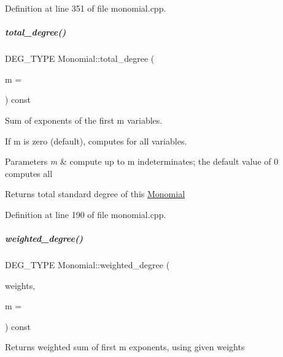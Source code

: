Definition at line 351 of file monomial.\+cpp.

\mbox{\label{group__polygroup_afe6df62857d9f58634d5f6c668f12d35}} 
\subparagraph{\texorpdfstring{total\+\_\+degree()}{total\_degree()}}
{\footnotesize\ttfamily D\+E\+G\+\_\+\+T\+Y\+PE Monomial\+::total\+\_\+degree (\begin{DoxyParamCaption}\item[{N\+V\+A\+R\+\_\+\+T\+Y\+PE}]{m = {} }\end{DoxyParamCaption}) const}



Sum of exponents of the first {\ttfamily m} variables. 

If {\ttfamily m} is zero (default), computes for all variables. 
\begin{DoxyParams}{Parameters}
{\em m} & compute up to {\ttfamily m} indeterminates; the default value of 0 computes all \\
\hline
\end{DoxyParams}
\begin{DoxyReturn}{Returns}
total standard degree of this \hyperlink{group__polygroup_class_monomial}{Monomial} 
\end{DoxyReturn}


Definition at line 190 of file monomial.\+cpp.

\mbox{\label{group__polygroup_a5b19863967dc9801997d2d1058f312a3}} 
\subparagraph{\texorpdfstring{weighted\+\_\+degree()}{weighted\_degree()}}
{\footnotesize\ttfamily D\+E\+G\+\_\+\+T\+Y\+PE Monomial\+::weighted\+\_\+degree (\begin{DoxyParamCaption}\item[{const W\+T\+\_\+\+T\+Y\+PE $\ast$}]{weights,  }\item[{N\+V\+A\+R\+\_\+\+T\+Y\+PE}]{m = {} }\end{DoxyParamCaption}) const}

\begin{DoxyReturn}{Returns}
weighted sum of first {\ttfamily m} exponents, using given {\ttfamily weights} 
\end{DoxyReturn}

